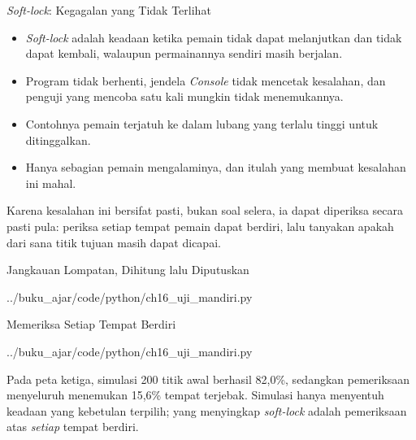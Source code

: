 \documentclass[aspectratio=169,10pt]{beamer}
\begin{document}
\begin{frame}{\emph{Soft-lock}: Kegagalan yang Tidak Terlihat}
\begin{itemize}
  \item \emph{Soft-lock} adalah keadaan ketika pemain tidak dapat melanjutkan
        dan tidak dapat kembali, walaupun permainannya sendiri masih berjalan.
  \item Program tidak berhenti, jendela \emph{Console} tidak mencetak kesalahan,
        dan penguji yang mencoba satu kali mungkin tidak menemukannya.
  \item Contohnya pemain terjatuh ke dalam lubang yang terlalu tinggi untuk
        ditinggalkan.
  \item Hanya sebagian pemain mengalaminya, dan itulah yang membuat kesalahan
        ini mahal.
\end{itemize}
\vspace{0.14cm}
\begin{kotak}
Karena kesalahan ini bersifat pasti, bukan soal selera, ia dapat diperiksa
secara pasti pula: periksa setiap tempat pemain dapat berdiri, lalu tanyakan
apakah dari sana titik tujuan masih dapat dicapai.
\end{kotak}
\end{frame}

\begin{frame}[fragile]{Jangkauan Lompatan, Dihitung lalu Diputuskan}

  {../buku_ajar/code/python/ch16_uji_mandiri.py}
\end{frame}

\begin{frame}[fragile]{Memeriksa Setiap Tempat Berdiri}

  {../buku_ajar/code/python/ch16_uji_mandiri.py}
\vspace{0.12cm}
\begin{kotak}
Pada peta ketiga, simulasi 200 titik awal berhasil 82,0\%,
sedangkan pemeriksaan menyeluruh menemukan 15,6\% tempat terjebak. Simulasi
hanya menyentuh keadaan yang kebetulan terpilih; yang menyingkap
\emph{soft-lock} adalah pemeriksaan atas \emph{setiap} tempat berdiri.
\end{kotak}
\end{frame}
\end{document}
